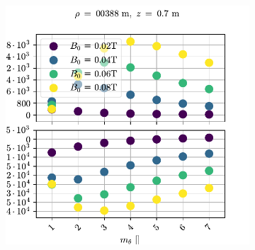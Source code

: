 \begin{figure}[htb]
    \centering
    \begin{subfigure}[h]{1.00\textwidth}
        \centering
        \includegraphics[width=1.0\textwidth]{fig/results/growthRates/growthRatesAnalyticB0}
        \label{fig:grAnalyticB}
    \end{subfigure}%
    \\
    \begin{subfigure}[h]{1.00\textwidth}
        \centering

\end{subfigure}
\end{figure}
